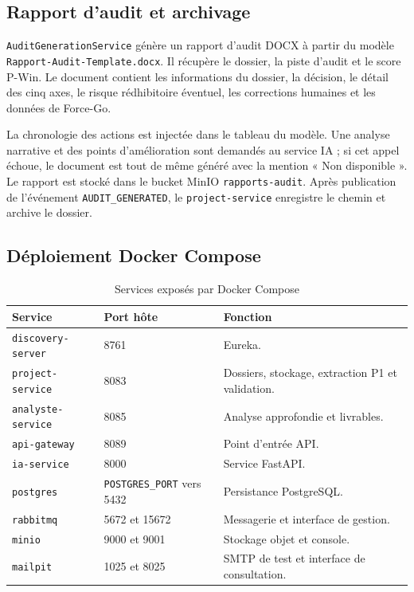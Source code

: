 \subsection{Rapport d’audit et archivage}

\texttt{AuditGenerationService} génère un rapport d’audit DOCX à partir du modèle \texttt{Rapport-Audit-Template.docx}. Il récupère le dossier, la piste d’audit et le score P-Win. Le document contient les informations du dossier, la décision, le détail des cinq axes, le risque rédhibitoire éventuel, les corrections humaines et les données de Force-Go.

La chronologie des actions est injectée dans le tableau du modèle. Une analyse narrative et des points d’amélioration sont demandés au service IA ; si cet appel échoue, le document est tout de même généré avec la mention « Non disponible ». Le rapport est stocké dans le bucket MinIO \texttt{rapports-audit}. Après publication de l’événement \texttt{AUDIT\_GENERATED}, le \texttt{project-service} enregistre le chemin et archive le dossier.

\subsection{Déploiement Docker Compose}

\begin{table}[H]
\centering
\small
\caption{Services exposés par Docker Compose}
\begin{tabularx}{\textwidth}{p{3.4cm}p{2.5cm}Y}
\toprule
\textbf{Service} & \textbf{Port hôte} & \textbf{Fonction} \\
\midrule
\texttt{discovery-server} & 8761 & Eureka. \\
\texttt{project-service} & 8083 & Dossiers, stockage, extraction P1 et validation. \\
\texttt{analyste-service} & 8085 & Analyse approfondie et livrables. \\
\texttt{api-gateway} & 8089 & Point d’entrée API. \\
\texttt{ia-service} & 8000 & Service FastAPI. \\
\texttt{postgres} & \texttt{POSTGRES\_PORT} vers 5432 & Persistance PostgreSQL. \\
\texttt{rabbitmq} & 5672 et 15672 & Messagerie et interface de gestion. \\
\texttt{minio} & 9000 et 9001 & Stockage objet et console. \\
\texttt{mailpit} & 1025 et 8025 & SMTP de test et interface de consultation. \\
\bottomrule
\end{tabularx}
\end{table}

